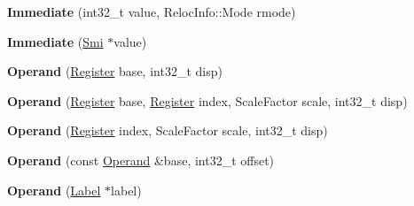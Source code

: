 \begin{DoxyCompactItemize}
\item 
{\bfseries Immediate} (int32\+\_\+t value, Reloc\+Info\+::\+Mode rmode)\hypertarget{classv8_1_1internal_1_1_b_a_s_e___e_m_b_e_d_d_e_d_a683f5f3586a71af5a441d59559669100}{}\label{classv8_1_1internal_1_1_b_a_s_e___e_m_b_e_d_d_e_d_a683f5f3586a71af5a441d59559669100}

\item 
{\bfseries Immediate} (\hyperlink{classv8_1_1internal_1_1_smi}{Smi} $\ast$value)\hypertarget{classv8_1_1internal_1_1_b_a_s_e___e_m_b_e_d_d_e_d_ac45839de8f3d7433ee961762cababc89}{}\label{classv8_1_1internal_1_1_b_a_s_e___e_m_b_e_d_d_e_d_ac45839de8f3d7433ee961762cababc89}

\item 
{\bfseries Operand} (\hyperlink{structv8_1_1internal_1_1_register}{Register} base, int32\+\_\+t disp)\hypertarget{classv8_1_1internal_1_1_b_a_s_e___e_m_b_e_d_d_e_d_a61b26d0f7288affbd502da5c6ef92919}{}\label{classv8_1_1internal_1_1_b_a_s_e___e_m_b_e_d_d_e_d_a61b26d0f7288affbd502da5c6ef92919}

\item 
{\bfseries Operand} (\hyperlink{structv8_1_1internal_1_1_register}{Register} base, \hyperlink{structv8_1_1internal_1_1_register}{Register} index, Scale\+Factor scale, int32\+\_\+t disp)\hypertarget{classv8_1_1internal_1_1_b_a_s_e___e_m_b_e_d_d_e_d_a8921d0a17eabb604421e6c8521f72d83}{}\label{classv8_1_1internal_1_1_b_a_s_e___e_m_b_e_d_d_e_d_a8921d0a17eabb604421e6c8521f72d83}

\item 
{\bfseries Operand} (\hyperlink{structv8_1_1internal_1_1_register}{Register} index, Scale\+Factor scale, int32\+\_\+t disp)\hypertarget{classv8_1_1internal_1_1_b_a_s_e___e_m_b_e_d_d_e_d_a2f307cf61c93969f5c23fb21d5ea656c}{}\label{classv8_1_1internal_1_1_b_a_s_e___e_m_b_e_d_d_e_d_a2f307cf61c93969f5c23fb21d5ea656c}

\item 
{\bfseries Operand} (const \hyperlink{classv8_1_1internal_1_1_operand}{Operand} \&base, int32\+\_\+t offset)\hypertarget{classv8_1_1internal_1_1_b_a_s_e___e_m_b_e_d_d_e_d_a3cc4bf04dd73c13f323cf942c364fbeb}{}\label{classv8_1_1internal_1_1_b_a_s_e___e_m_b_e_d_d_e_d_a3cc4bf04dd73c13f323cf942c364fbeb}

\item 
{\bfseries Operand} (\hyperlink{classv8_1_1internal_1_1_label}{Label} $\ast$label)\hypertarget{classv8_1_1internal_1_1_b_a_s_e___e_m_b_e_d_d_e_d_a8c37ca24e9586b12844e56ccf26542f2}{}\label{classv8_1_1internal_1_1_b_a_s_e___e_m_b_e_d_d_e_d_a8c37ca24e9586b12844e56ccf26542f2}


\end{DoxyCompactItemize}
